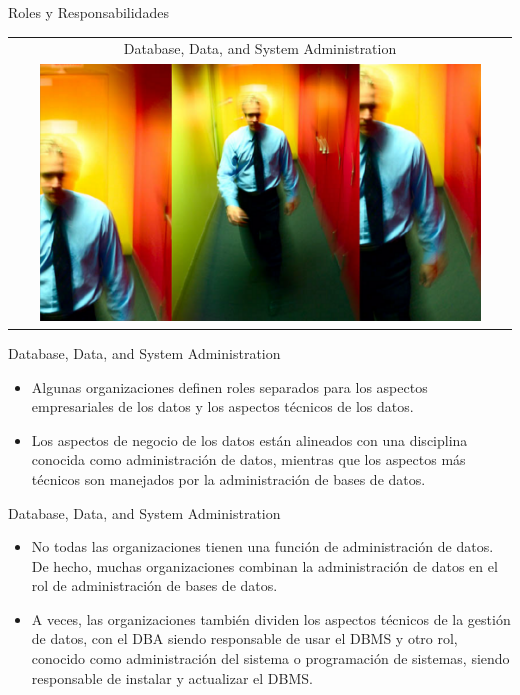 \documentclass{beamer}
\begin{document}
\begin{frame}{Roles y Responsabilidades}
    \begin{tabular}{c}
        Database, Data, and System Administration \\
        \includegraphics[width=0.9\textwidth]{figures/DDS.png}
    \end{tabular}
\end{frame}

\begin{frame}{Database, Data, and System Administration}
    \begin{itemize}
        \item Algunas organizaciones definen roles separados para los aspectos empresariales de los datos y los aspectos técnicos de los datos.
        \item Los aspectos de negocio de los datos están alineados con una disciplina conocida como administración de datos, mientras que los aspectos más técnicos son manejados por la administración de bases de datos. 
    \end{itemize}
\end{frame}

\begin{frame}{Database, Data, and System Administration}
    \begin{itemize}
        \item No todas las organizaciones tienen una función de administración de datos. De hecho, muchas organizaciones combinan la administración de datos en el rol de administración de bases de datos. 
        \item A veces, las organizaciones también dividen los aspectos técnicos de la gestión de datos, con el DBA siendo responsable de usar el DBMS y otro rol, conocido como administración del sistema o programación de sistemas, siendo responsable de instalar y actualizar el DBMS.
    \end{itemize}
\end{frame}
\end{document}
